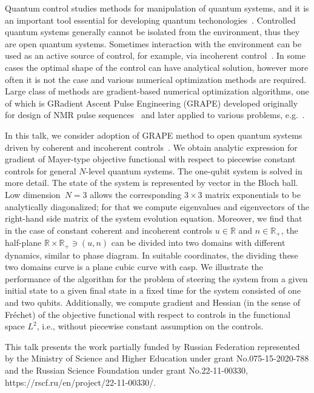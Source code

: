 \documentclass[12pt]{llncs}
\begin{document}
Quantum control studies methods for manipulation of quantum systems, and it is an important tool  essential for developing quantum techonologies~\cite{1}. Controlled quantum systems generally cannot be isolated from the environment, thus they are open quantum systems. Sometimes interaction with the environment can be used as an active source of control, for example, via incoherent control~\cite{2,3}. In some cases the optimal shape of the control can have analytical solution, however more often it is not the case and various numerical optimization methods are required.  Large class of methods are gradient-based numerical optimization algorithms, one of which is GRadient Ascent Pulse Engineering (GRAPE) developed originally for design of NMR pulse sequences~\cite{4} and later applied to various problems, e.g.~\cite{5,6}. 

In this talk, we consider adoption of  GRAPE method to open quantum systems driven by coherent and incoherent controls~\cite{7}. We obtain analytic expression for gradient of Mayer-type objective functional with respect to piecewise constant controls for general $N$-level quantum systems.  The one-qubit system is  solved in more detail. The state of the system is represented by vector in the Bloch ball. Low dimension~$N = 3$ allows the corresponding $3\times3$ matrix exponentials to be analytically diagonalized; for that we compute eigenvalues and eigenvectors of the right-hand side matrix of the system evolution equation. Moreover, we find that in the case of constant coherent and incoherent controls $u\in\mathbb R$ and $n\in\mathbb R_+$, the half-plane $\mathbb R\times \mathbb R_+\ni(u,n)$ can be divided into two domains with different dynamics, similar to phase diagram. In suitable coordinates, the dividing these two domains curve is a plane cubic curve with casp. We illustrate the performance of the algorithm for the problem of steering the system from a given initial state to a given final state in a fixed time for the system consisted of one and two qubits. Additionally, we compute gradient and Hessian (in the sense of Fr\'{e}chet) of the objective functional with respect to controls in the functional space $L^2$, i.e., without piecewise constant assumption on the controls.

This talk presents the work partially funded by Russian Federation represented by the
Ministry of Science and Higher Education under grant No.075-15-2020-788 and the Russian Science Foundation under grant No.22-11-00330, https://rscf.ru/en/project/22-11-00330/. 
\end{document}
